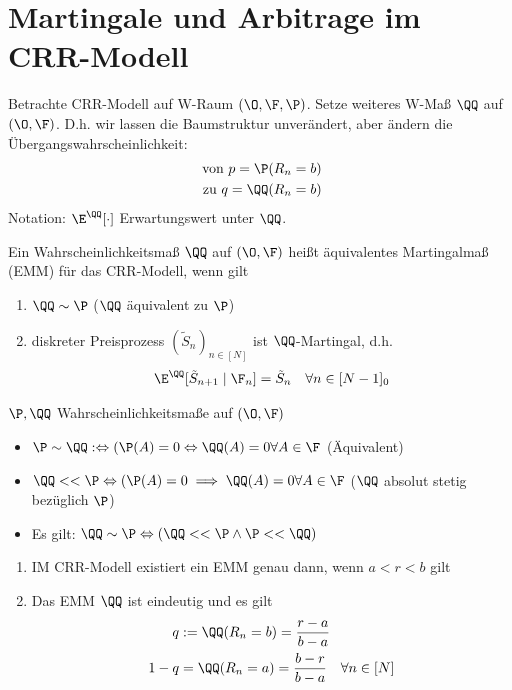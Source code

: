 \section{Martingale und Arbitrage im CRR-Modell}
Betrachte CRR-Modell auf W-Raum $(\O,\F,\P)$. Setze weiteres W-Maß $\QQ$ auf $(\O,\F)$. D.h. wir lassen die Baumstruktur unverändert, aber ändern die Übergangswahrscheinlichkeit:
\begin{align*}
	\text{ von }p = \P(R_n = b)\\
	\text{ zu }q = \QQ(R_n = b)
\end{align*}
Notation: $\E^{\QQ}[\cdot]$ Erwartungswert unter $\QQ$.
\begin{definition}
	Ein Wahrscheinlichkeitsmaß $\QQ$ auf $(\O,\F)$ heißt äquivalentes Martingalmaß (EMM) für das CRR-Modell, wenn gilt
	\begin{enumerate}
		\item $\QQ\sim \P$ ($\QQ$ äquivalent zu $\P$)
		\item diskreter Preisprozess $(\tilde{S}_n)_{n \in [N]}$ ist $\QQ$-Martingal, d.h.
		\begin{align*}
			\E^{\QQ}[\tilde{S}_{n+1}\mid \F_n] = \tilde{S}_n \quad \forall n \in [N-1]_0
		\end{align*}
	\end{enumerate}
\end{definition}
\begin{erinnerung}
	$\P, \QQ$ Wahrscheinlichkeitsmaße auf $(\O,\F)$
	\begin{itemize}
		\item $\P \sim \QQ :\Leftrightarrow (\P(A) = 0 \Leftrightarrow \QQ(A) = 0 \forall A \in \F$ (Äquivalent)
		\item $\QQ << \P \Leftrightarrow (\P(A) = 0 \implies \QQ(A) = 0 \forall A \in \F$ ($\QQ$ absolut stetig bezüglich $\P$)
		\item Es gilt: $\QQ \sim \P \Leftrightarrow (\QQ << \P \wedge \P << \QQ)$
	\end{itemize}
\end{erinnerung}
\begin{theorem}
	\begin{enumerate}
		\item IM CRR-Modell existiert ein EMM genau dann, wenn $a < r < b$ gilt
		\item Das EMM $\QQ$ ist eindeutig und es gilt
		\begin{align*}
			q &:= \QQ(R_n = b) = \frac{r-a}{b-a}\\
			1-q &= \QQ(R_n = a) = \frac{b-r}{b-a} \quad \forall n \in [N]
		\end{align*}
	\end{enumerate}
\end{theorem}
